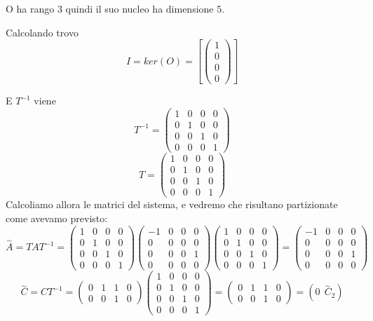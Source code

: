 \documentclass{article}
\begin{document}
O ha rango $ 3 $ quindi il suo nucleo ha dimensione $ 5 $.

Calcolando trovo \[ 
I = ker(O) = \left[ \left(\begin{matrix}1\\0\\0\\0\end{matrix}\right)\right]\]

E $T^{-1}$ viene \[ 
T^{-1} = \left(\begin{matrix}1 & 0 & 0 & 0\\0 & 1 & 0 & 0\\0 & 0 & 1 & 0\\0 & 0 & 0 & 1\end{matrix}\right) \]
\[ 
T = \left(\begin{matrix}1 & 0 & 0 & 0\\0 & 1 & 0 & 0\\0 & 0 & 1 & 0\\0 & 0 & 0 & 1\end{matrix}\right) \]Calcoliamo allora le matrici del sistema, e vedremo che risultano partizionate come avevamo previsto:
\[ 
\overset{\sim}{A} = T A  T^{-1} = \left(\begin{matrix}1 & 0 & 0 & 0\\0 & 1 & 0 & 0\\0 & 0 & 1 & 0\\0 & 0 & 0 & 1\end{matrix}\right)\left(\begin{matrix}-1 & 0 & 0 & 0\\0 & 0 & 0 & 0\\0 & 0 & 0 & 1\\0 & 0 & 0 & 0\end{matrix}\right)\left(\begin{matrix}1 & 0 & 0 & 0\\0 & 1 & 0 & 0\\0 & 0 & 1 & 0\\0 & 0 & 0 & 1\end{matrix}\right) = \left(\begin{matrix}-1 & 0 & 0 & 0\\0 & 0 & 0 & 0\\0 & 0 & 0 & 1\\0 & 0 & 0 & 0\end{matrix}\right) \]
\[ 
\overset{\sim}{C} = CT^{-1} = \left(\begin{matrix}0 & 1 & 1 & 0\\0 & 0 & 1 & 0\end{matrix}\right)\left(\begin{matrix}1 & 0 & 0 & 0\\0 & 1 & 0 & 0\\0 & 0 & 1 & 0\\0 & 0 & 0 & 1\end{matrix}\right) = \left(\begin{matrix}0 & 1 & 1 & 0\\0 & 0 & 1 & 0\end{matrix}\right) = ( 0\ \ \overset{\sim}{C}_2) \]
\end{document}
